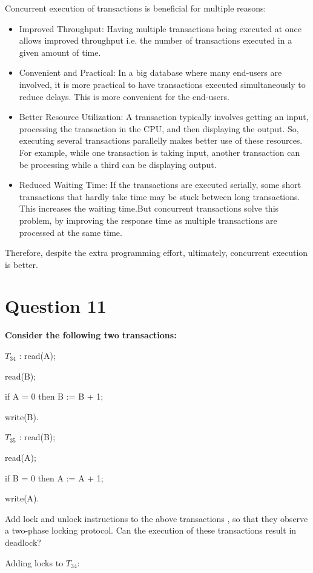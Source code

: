 \documentclass[12pt]{article}
\begin{document}
Concurrent execution of transactions is beneficial for multiple reasons:
\begin{itemize}
    \item Improved Throughput: Having multiple transactions being executed at once allows improved throughput i.e. the number of transactions executed in a given amount of time.
    \item Convenient and Practical: In a big database where many end-users are involved, it is more practical to have transactions executed simultaneously to reduce delays. This is more convenient for the end-users.
    \item Better Resource Utilization: A transaction typically involves getting an input, processing the transaction in the CPU, and then displaying the output. So, executing several transactions parallelly makes better use of these resources. For example, while one transaction is taking input, another transaction can be processing while a third can be displaying output.
    \item Reduced Waiting Time: If the transactions are executed serially, some short transactions that hardly take time may be stuck between long transactions. This increases the waiting time.But concurrent transactions solve this problem, by improving the response time as multiple transactions are processed at the same time.
\end{itemize}
Therefore, despite the extra programming effort, ultimately, concurrent execution is better.

\section*{Question 11}
{\bfseries Consider the following two transactions:

$T_{34}$ : read(A);

read(B);

if A = 0 then B := B + 1;

write(B). 

$T_{35}$ : read(B);

read(A);

if B = 0 then A := A + 1;

write(A). 

Add lock and unlock instructions to the above transactions , so that they observe a two-phase locking protocol. Can the execution of these transactions result in deadlock?}

Adding locks to $T_{34}$:
\end{document}
